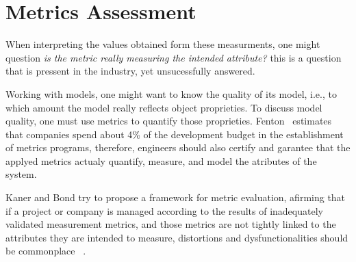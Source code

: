 \section{Metrics Assessment} \label{assess}
\begin{comment}
Effective management of any process requires quantification, measurement, and modeling.
Software metrics provide a quantitative basis for the development and validation of models of the software development process.
Metrics can be used to improve software productivity and quality\cite{g1:Millis:1998}.
\end{comment}



\par When interpreting the values obtained form these measurments, one might question \emph{is the metric really measuring the intended attribute?} this is a question that is pressent in the industry, yet unsucessfully answered. 

\par Working with models, one might want to know the quality of its model, i.e., to which amount the model really reflects object proprieties. To discuss model quality, one must use metrics to quantify those proprieties. Fenton~\cite{g1:Fenton:1999} estimates that companies spend about 4\% of the development budget in the establishment of metrics programs, therefore, engineers should also certify and garantee that the applyed metrics actualy quantify, measure, and model the atributes of the system.

\par Kaner and Bond try to propose a framework for metric evaluation, afirming that if a project or company is managed according to the results of inadequately validated measurement metrics, and those metrics are not tightly linked to the attributes they are intended to measure, distortions and dysfunctionalities should be commonplace ~\cite{g1:kaner:2004}.

\begin{comment}
	This has a likely consequence: if a project or company is managed according to the results of measurements, and those metrics are inadequately validated, insuficiently understood, and not tightly linked to the attributes they are intended to measure, measurement distortions and dysfunctional should be commonplace\cite{g1:kaner:2004}.
\end{comment}

